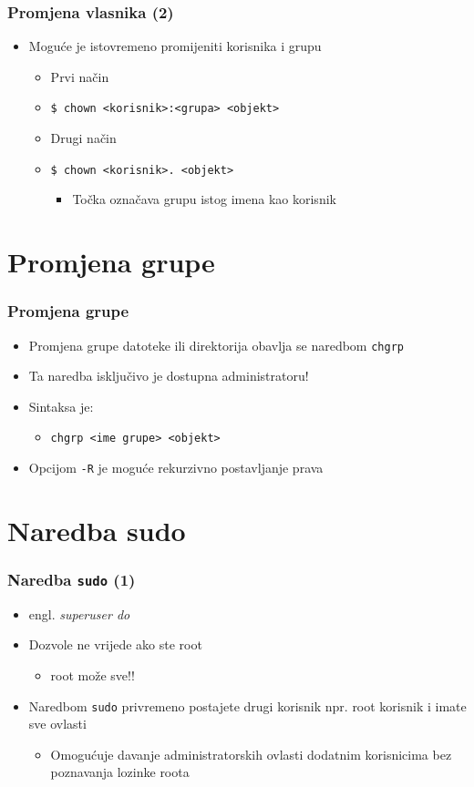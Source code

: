 \documentclass[table,usenames,dvipsnames]{beamer}
\newcommand{\shell}[1]{\texttt{#1}}
\begin{document}
\begin{frame}[t]
\frametitle{Promjena vlasnika (2)}
\begin{itemize}
  \item Moguće je istovremeno promijeniti korisnika i grupu
  \begin{itemize}
    \item Prvi način
    \item[] \shell{\$ chown <korisnik>:<grupa>  <objekt>}
    \item Drugi način
    \item[] \shell{\$ chown <korisnik>.  <objekt>}
    \begin{itemize}
      \item Točka označava grupu istog imena kao korisnik 
    \end{itemize}
  \end{itemize}
\end{itemize}
\end{frame}

\section{Promjena grupe}
\begin{frame}[t]
\frametitle{Promjena grupe}
\begin{itemize}
  \item Promjena grupe datoteke ili direktorija obavlja se naredbom 
        \shell{chgrp}
  \item Ta naredba isključivo je dostupna administratoru!
  \item Sintaksa je:
  \begin{itemize}
    \item[] \shell{chgrp <ime grupe> <objekt>}
  \end{itemize}
  \item Opcijom \shell{-R} je moguće rekurzivno postavljanje prava 
\end{itemize}
\end{frame}

\section{Naredba sudo}
\begin{frame}[t]
\frametitle{Naredba \shell{sudo} (1)}
\begin{itemize}
  \item engl. \emph{superuser do}
  \item Dozvole ne vrijede ako ste root
  \begin{itemize}
    \item root može sve!!
  \end{itemize}
  \item Naredbom \shell{sudo} privremeno postajete drugi korisnik npr. 
        root korisnik i imate sve ovlasti
  \begin{itemize}
    \item Omogućuje davanje administratorskih ovlasti dodatnim korisnicima
          bez poznavanja lozinke roota
  \end{itemize}
\end{itemize}
\end{frame}
\end{document}
